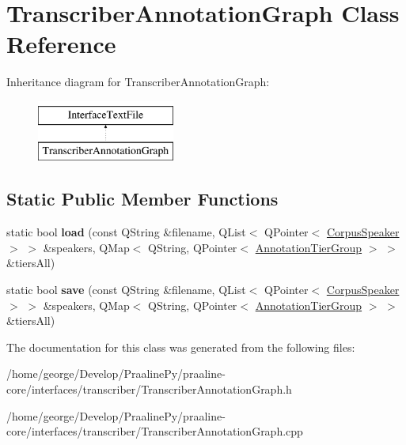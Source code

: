 \hypertarget{class_transcriber_annotation_graph}{}\section{Transcriber\+Annotation\+Graph Class Reference}
\label{class_transcriber_annotation_graph}
Inheritance diagram for Transcriber\+Annotation\+Graph\+:\begin{figure}[H]
\begin{center}
\leavevmode
\includegraphics[height=2.000000cm]{class_transcriber_annotation_graph}
\end{center}
\end{figure}
\subsection*{Static Public Member Functions}
\begin{DoxyCompactItemize}
\item 
\mbox{\label{class_transcriber_annotation_graph_aa7350916f3c3cd7396e5b9255eb148ca}} 
static bool {\bfseries load} (const Q\+String \&filename, Q\+List$<$ Q\+Pointer$<$ \hyperlink{class_corpus_speaker}{Corpus\+Speaker} $>$ $>$ \&speakers, Q\+Map$<$ Q\+String, Q\+Pointer$<$ \hyperlink{class_annotation_tier_group}{Annotation\+Tier\+Group} $>$ $>$ \&tiers\+All)
\item 
\mbox{\label{class_transcriber_annotation_graph_a053769342578f24608d3821d433bf321}} 
static bool {\bfseries save} (const Q\+String \&filename, Q\+List$<$ Q\+Pointer$<$ \hyperlink{class_corpus_speaker}{Corpus\+Speaker} $>$ $>$ \&speakers, Q\+Map$<$ Q\+String, Q\+Pointer$<$ \hyperlink{class_annotation_tier_group}{Annotation\+Tier\+Group} $>$ $>$ \&tiers\+All)
\end{DoxyCompactItemize}


The documentation for this class was generated from the following files\+:\begin{DoxyCompactItemize}
\item 
/home/george/\+Develop/\+Praaline\+Py/praaline-\/core/interfaces/transcriber/Transcriber\+Annotation\+Graph.\+h\item 
/home/george/\+Develop/\+Praaline\+Py/praaline-\/core/interfaces/transcriber/Transcriber\+Annotation\+Graph.\+cpp\end{DoxyCompactItemize}
